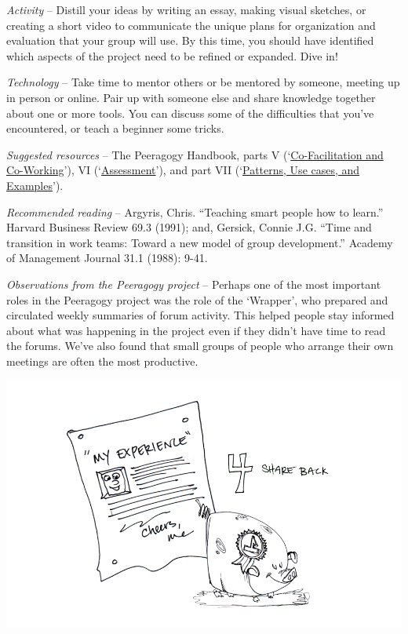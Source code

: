 \emph{Activity} -- Distill your ideas by writing an essay, making visual
sketches, or creating a short video to communicate the unique plans for
organization and evaluation that your group will use. By this time, you
should have identified which aspects of the project need to be refined
or expanded. Dive in!

\emph{Technology} -- Take time to mentor others or be mentored by
someone, meeting up in person or online. Pair up with someone else and
share knowledge together about one or more tools. You can discuss some
of the difficulties that you've encountered, or teach a beginner some
tricks.

\emph{Suggested resources} -- The Peeragogy Handbook, parts V
(`\href{http://peeragogy.org/co-facilitation/}{Co-Facilitation and
Co-Working}'), VI
(`\href{http://peeragogy.org/assessment/}{Assessment}'), and part VII
(`\href{http://peeragogy.org/patterns-usecases/}{Patterns, Use cases,
and Examples}').

\emph{Recommended reading} -- Argyris, Chris. ``Teaching smart people
how to learn.'' Harvard Business Review 69.3 (1991); and, Gersick,
Connie J.G. ``Time and transition in work teams: Toward a new model of
group development.'' Academy of Management Journal 31.1 (1988): 9-41.

\emph{Observations from the Peeragogy project} -- Perhaps one of the
most important roles in the Peeragogy project was the role of the
`Wrapper', who prepared and circulated weekly summaries of forum
activity. This helped people stay informed about what was happening in
the project even if they didn't have time to read the forums. We've also
found that small groups of people who arrange their own meetings are
often the most productive.

\begin{center}
\includegraphics{../pictures/OpenBook-2-4.jpg}
\end{center}

